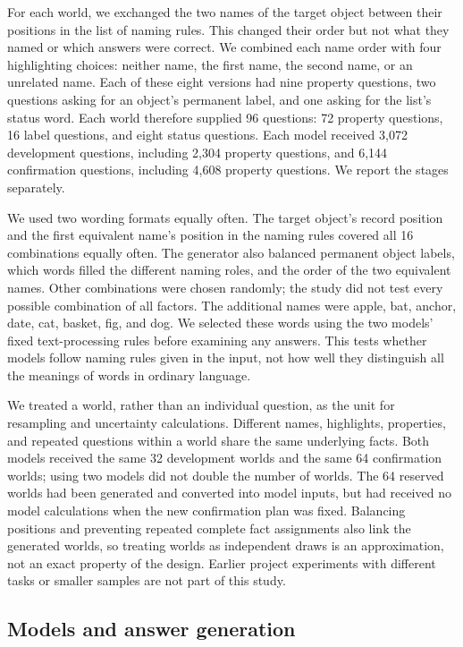 \documentclass[10pt,letterpaper]{article}
\begin{document}
For each world, we exchanged the two names of the target object between their positions in the list of naming rules. This changed their order but not what they named or which answers were correct. We combined each name order with four highlighting choices: neither name, the first name, the second name, or an unrelated name. Each of these eight versions had nine property questions, two questions asking for an object's permanent label, and one asking for the list's status word. Each world therefore supplied 96 questions: 72 property questions, 16 label questions, and eight status questions. Each model received 3,072 development questions, including 2,304 property questions, and 6,144 confirmation questions, including 4,608 property questions. We report the stages separately.


We used two wording formats equally often. The target object's record position and the first equivalent name's position in the naming rules covered all 16 combinations equally often. The generator also balanced permanent object labels, which words filled the different naming roles, and the order of the two equivalent names. Other combinations were chosen randomly; the study did not test every possible combination of all factors. The additional names were apple, bat, anchor, date, cat, basket, fig, and dog. We selected these words using the two models' fixed text-processing rules before examining any answers. This tests whether models follow naming rules given in the input, not how well they distinguish all the meanings of words in ordinary language.


We treated a world, rather than an individual question, as the unit for resampling and uncertainty calculations. Different names, highlights, properties, and repeated questions within a world share the same underlying facts. Both models received the same 32 development worlds and the same 64 confirmation worlds; using two models did not double the number of worlds. The 64 reserved worlds had been generated and converted into model inputs, but had received no model calculations when the new confirmation plan was fixed. Balancing positions and preventing repeated complete fact assignments also link the generated worlds, so treating worlds as independent draws is an approximation, not an exact property of the design. Earlier project experiments with different tasks or smaller samples are not part of this study.


\subsection*{Models and answer generation}
\end{document}
